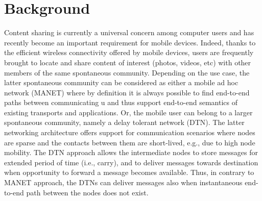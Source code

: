 ﻿\chapter{Background}
\label{chapter:background}
\minitoc

Content sharing is currently a universal concern among computer users and has recently become an important requirement for mobile devices. Indeed, thanks to the efficient wireless connectivity offered by mobile devices, users are frequently brought to locate and share content of interest (photos, videos, etc) with other members of the same spontaneous community. Depending on the use case, the latter spontaneous community can be considered as either a mobile ad hoc network (MANET) where by definition it is always possible to find end-to-end paths between communicating u and thus support end-to-end semantics of existing transports and applications. Or, the mobile user can belong to a larger spontaneous community, namely a delay tolerant network (DTN). The latter networking architecture offers support for communication scenarios where nodes are sparse and the contacts between them are short-lived, e.g., due to high node mobility. The DTN approach allows the intermediate nodes to store messages for extended period of time (i.e., carry), and to deliver messages towards destination when opportunity to forward a message becomes available. Thus, in contrary to MANET approach, the DTNs can deliver messages also when instantaneous end-to-end path between the nodes does not exist. 

